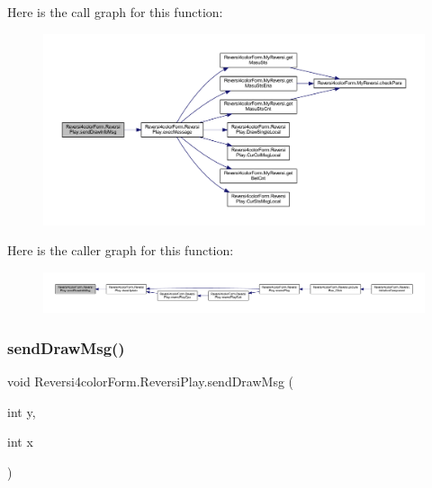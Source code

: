 Here is the call graph for this function\+:\nopagebreak
\begin{figure}[H]
\begin{center}
\leavevmode
\includegraphics[width=350pt]{class_reversi4color_form_1_1_reversi_play_a99633b55c8a3beff94a2726927fcef09_cgraph}
\end{center}
\end{figure}
Here is the caller graph for this function\+:\nopagebreak
\begin{figure}[H]
\begin{center}
\leavevmode
\includegraphics[width=350pt]{class_reversi4color_form_1_1_reversi_play_a99633b55c8a3beff94a2726927fcef09_icgraph}
\end{center}
\end{figure}
\mbox{\label{class_reversi4color_form_1_1_reversi_play_ab6f979e1e361e6488e8bba9203b6a5b2}} 
\subsubsection{\texorpdfstring{send\+Draw\+Msg()}{sendDrawMsg()}}
{\footnotesize\ttfamily void Reversi4color\+Form.\+Reversi\+Play.\+send\+Draw\+Msg (\begin{DoxyParamCaption}\item[{int}]{y,  }\item[{int}]{x }\end{DoxyParamCaption})}



